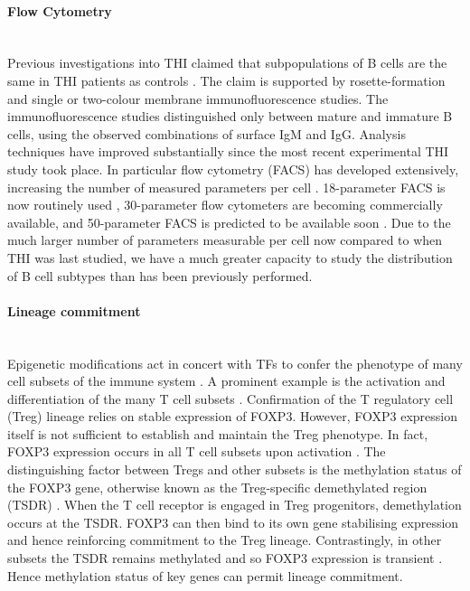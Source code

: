 \documentclass[12pt]{article}
\begin{document}
			\paragraph{Flow Cytometry}
			~\\
			Previous investigations into THI claimed that subpopulations of B cells are the same in THI patients as controls \citep{Tiller78,Stiemh80,Siegel81,Buckley83,Fiorilli86,Dressler89}. 
			The claim is supported by rosette-formation and single or two-colour membrane immunofluorescence studies. 
			The immunofluorescence studies distinguished only between mature and immature B cells, using the observed combinations of surface IgM and IgG. 
			Analysis techniques have improved substantially since the most recent experimental THI study took place.
			In particular flow cytometry (FACS) has developed extensively, increasing the number of measured parameters per cell \citep{Saeys16}.
			18-parameter FACS is now routinely used \citep{Perfetto04}, 30-parameter flow cytometers are becoming commercially available, and 50-parameter FACS is predicted to be available soon \citep{Saeys16}.
			Due to the much larger number of parameters measurable per cell now compared to when THI was last studied, we have a much greater capacity to study the distribution of B cell subtypes than has been previously performed.
			
			
		\paragraph{Lineage commitment}
		~\\
			Epigenetic modifications act in concert with TFs to confer the phenotype of many cell subsets of the immune system \citep{Lara14,Zan15,Mercer11}. 
			A prominent example is the activation and differentiation of the many T cell subsets \citep{Begin14, Zeng13}. 
			Confirmation of the T regulatory cell (Treg) lineage relies on stable expression of FOXP3.
			However, FOXP3 expression itself is not sufficient to establish and maintain the Treg phenotype.
			In fact, FOXP3 expression occurs in all T cell subsets upon activation \citep{Ohkura13,Polansky08}.
			The distinguishing factor between Tregs and other subsets is the methylation status of the FOXP3 gene, otherwise known as the Treg-specific demethylated region (TSDR) \cite{Shimazu16}.
			When the T cell receptor is engaged in Treg progenitors, demethylation occurs at the TSDR. 
			FOXP3 can then bind to its own gene stabilising expression and hence reinforcing commitment to the Treg lineage.
			Contrastingly, in other subsets the TSDR remains methylated and so FOXP3 expression is transient \citep{Ohkura13}.
			Hence methylation status of key genes can permit lineage commitment. 
			
\end{document}
